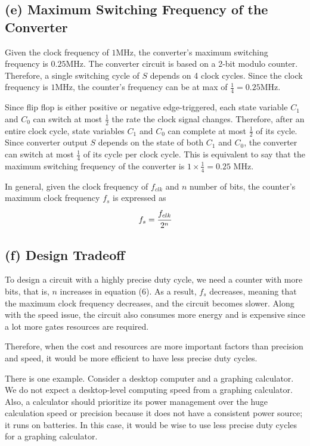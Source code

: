 \documentclass{article}
\begin{document}
\subsection*{(e) Maximum Switching Frequency of the Converter}
Given the clock frequency of $1$MHz, the converter’s maximum switching frequency is $0.25$MHz.
The converter circuit is based on a 2-bit modulo counter. Therefore, a single switching cycle of $S$ depends on 4 clock cycles. Since the clock frequency is $1$MHz, the counter’s frequency can be at max of $\frac{1}{4} = 0.25$MHz.

Since flip flop is either positive or negative edge-triggered, each state variable $C_1$ and $C_0$ can switch at most $\frac{1}{2}$ the rate the clock signal changes. Therefore, after an entire clock cycle, state variables $C_1$ and $C_0$ can complete at most $\frac{1}{2}$ of its cycle. Since converter output $S$ depends on the state of both $C_1$ and $C_0$, the converter can switch at most $\frac{1}{4}$ of its cycle per clock cycle. This is equivalent to say that the maximum switching frequency of the converter is $1 \times \frac{1}{4} = 0.25$ MHz.

In general, given the clock frequency of $f_{clk}$ and $n$ number of bits, the counter’s maximum clock frequency $f_s$ is expressed as
\begin{equation}
f_s = \cfrac{f_{clk}}{2^n}
\end{equation}


\subsection*{(f) Design Tradeoff}
To design a circuit with a highly precise duty cycle, we need a counter with more bits, that is, $n$ increases in equation (6). As a result, $f_s$ decreases, meaning that the maximum clock frequency decreases, and the circuit becomes slower. Along with the speed issue, the circuit also consumes more energy and is expensive since a lot more gates resources are required.

Therefore, when the cost and resources are more important factors than precision and speed, it would be more efficient to have less precise duty cycles.

There is one example. Consider a desktop computer and a graphing calculator. We do not expect a desktop-level computing speed from a graphing calculator. Also, a calculator should prioritize its power management over the huge calculation speed or precision because it does not have a consistent power source; it runs on batteries. In this case, it would be wise to use less precise duty cycles for a graphing calculator.
\end{document}
